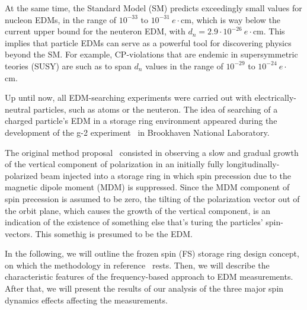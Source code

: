 \documentclass[]{elsarticle}
\begin{document}
At the same time, the Standard Model (SM) predicts exceedingly small values for nucleon EDMs,
in the range of $10^{-33}$ to $10^{-31}~e\cdot$cm,
which is way below the current upper bound for the neuteron EDM,
with $d_n = 2.9\cdot 10^{-26}~e\cdot$cm. This implies that particle EDMs can serve as a powerful tool
for discovering physics beyond the SM. For example, CP-violations that are endemic in
supersymmetric teories (SUSY) are such as to span $d_n$ values in the range of
$10^{-29}$ to $10^{-24}~e\cdot$cm.~\cite{JEDI}

Up until now, all EDM-searching experiments were carried out with electrically-neutral particles, such as
atoms or the neuteron. The idea of searching of a charged particle's EDM in a storage ring environment
appeared during the development of the g-2 experiment~\cite{BNL:g-2:2001} in Brookhaven National Laboratory.

The original method proposal~\cite{BNL:Deuteron2008} consisted in observing a slow and gradual
growth of the vertical component of polarization in an initially fully longitudinally-polarized beam
injected into a storage ring in which spin precession due to the magnetic dipole moment (MDM) is suppressed.
Since the MDM component of spin precession is assumed to be zero, the tilting of the polarization vector
out of the orbit plane, which causes the growth of the vertical component, is an indication of the existence
of something else that's turing the particles' spin-vectors. This somethig is presumed to be the EDM.

In the following, we will outline the frozen spin (FS) storage ring design concept,
on which the methodology in reference~\cite{BNL:Deuteron2008} rests. Then, we will describe the characteristic
features of the frequency-based approach to EDM measurements. After that, we will present the results
of our analysis of the three major spin dynamics effects affecting the measurements.
\end{document}
